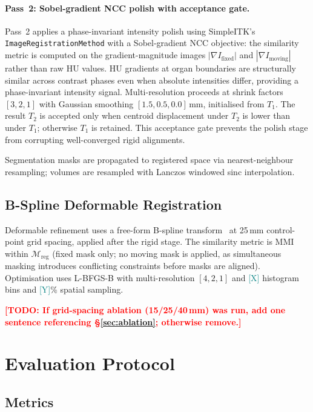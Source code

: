 \documentclass[10pt,twocolumn]{article}
\newcommand{\TODO}[1]{\textcolor{red}{\textbf{[TODO: #1]}}}
\newcommand{\NUM}[1]{\textcolor{teal}{[#1]}}
\newcommand{\Mreg}{\mathcal{M}_{\text{reg}}}
\begin{document}
\paragraph{Pass~2: Sobel-gradient NCC polish with acceptance gate.}
Pass~2 applies a phase-invariant intensity polish using SimpleITK's
\texttt{ImageRegistrationMethod} with a Sobel-gradient NCC objective:
the similarity metric is computed on the gradient-magnitude images
$|\nabla I_\text{fixed}|$ and $|\nabla I_\text{moving}|$ rather than
raw HU values.
HU gradients at organ boundaries are structurally similar across
contrast phases even when absolute intensities differ, providing a
phase-invariant intensity signal.
Multi-resolution proceeds at shrink factors $[3, 2, 1]$ with Gaussian
smoothing $[1.5, 0.5, 0.0]$\,mm, initialised from $T_1$.
The result $T_2$ is accepted only when centroid displacement under
$T_2$ is lower than under $T_1$; otherwise $T_1$ is retained.
This acceptance gate prevents the polish stage from corrupting
well-converged rigid alignments.

Segmentation masks are propagated to registered space via
nearest-neighbour resampling; volumes are resampled with Lanczos
windowed sinc interpolation.

\subsection{B-Spline Deformable Registration}
\label{sec:deformable}

Deformable refinement uses a free-form B-spline
transform~\cite{rueckert1999} at 25\,mm control-point grid spacing,
applied after the rigid stage.
The similarity metric is MMI within $\Mreg$ (fixed mask only; no
moving mask is applied, as simultaneous masking introduces conflicting
constraints before masks are aligned).
Optimisation uses L-BFGS-B with multi-resolution $[4, 2, 1]$ and
\NUM{X} histogram bins and \NUM{Y}\% spatial sampling.

\TODO{If grid-spacing ablation (15/25/40\,mm) was run, add one sentence
referencing \S\ref{sec:ablation}; otherwise remove.}

\section{Evaluation Protocol}
\label{sec:eval}

\subsection{Metrics}
\end{document}
